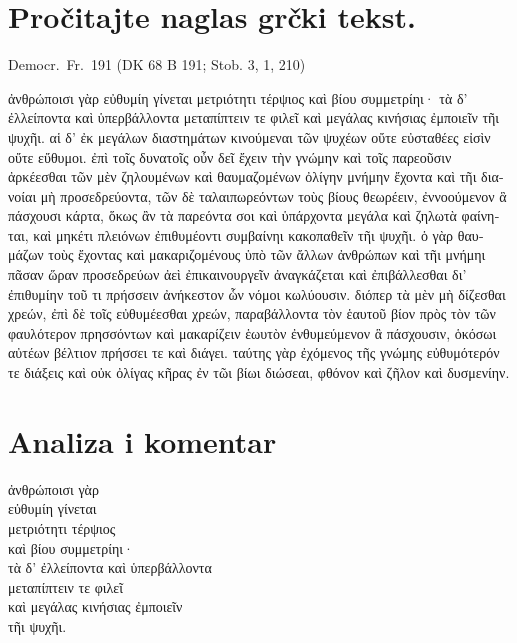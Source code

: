 
\section*{Pročitajte naglas grčki tekst.}

Democr.\ Fr.\ 191 (DK 68 B 191; Stob. 3, 1, 210)


\medskip


{\large

\begin{greek}

\noindent ἀνθρώποισι γὰρ εὐθυμίη γίνεται μετριότητι τέρψιος καὶ βίου συμμετρίηι· τὰ δ' ἐλλείποντα καὶ ὑπερβάλλοντα μεταπίπτειν τε φιλεῖ καὶ μεγάλας κινήσιας ἐμποιεῖν τῆι ψυχῆι. αἱ δ' ἐκ μεγάλων διαστημάτων κινούμεναι τῶν ψυχέων οὔτε εὐσταθέες εἰσὶν οὔτε εὔθυμοι. ἐπὶ τοῖς δυνατοῖς οὖν δεῖ ἔχειν τὴν γνώμην καὶ τοῖς παρεοῦσιν ἀρκέεσθαι τῶν μὲν ζηλουμένων καὶ θαυμαζομένων ὀλίγην μνήμην ἔχοντα καὶ τῆι διανοίαι μὴ προσεδρεύοντα, τῶν δὲ ταλαιπωρεόντων τοὺς βίους θεωρέειν, ἐννοούμενον ἃ πάσχουσι κάρτα, ὅκως ἂν τὰ παρεόντα σοι καὶ ὑπάρχοντα μεγάλα καὶ ζηλωτὰ φαίνηται, καὶ μηκέτι πλειόνων ἐπιθυμέοντι συμβαίνηι κακοπαθεῖν τῆι ψυχῆι. ὁ γὰρ θαυμάζων τοὺς ἔχοντας καὶ μακαριζομένους ὑπὸ τῶν ἄλλων ἀνθρώπων καὶ τῆι μνήμηι πᾶσαν ὥραν προσεδρεύων ἀεὶ ἐπικαινουργεῖν ἀναγκάζεται καὶ ἐπιβάλλεσθαι δι' ἐπιθυμίην τοῦ τι πρήσσειν ἀνήκεστον ὧν νόμοι κωλύουσιν. διόπερ τὰ μὲν μὴ δίζεσθαι χρεών, ἐπὶ δὲ τοῖς εὐθυμέεσθαι χρεών, παραβάλλοντα τὸν ἑαυτοῦ βίον πρὸς τὸν τῶν φαυλότερον πρησσόντων καὶ μακαρίζειν ἑωυτὸν ἐνθυμεύμενον ἃ πάσχουσιν, ὁκόσωι αὐτέων βέλτιον πρήσσει τε καὶ διάγει. ταύτης γὰρ ἐχόμενος τῆς γνώμης εὐθυμότερόν τε διάξεις καὶ οὐκ ὀλίγας κῆρας ἐν τῶι βίωι διώσεαι, φθόνον καὶ ζῆλον καὶ δυσμενίην. 

\end{greek}

}


\section*{Analiza i komentar}


{\large
\begin{greek}
\noindent ἀνθρώποισι γὰρ \\
εὐθυμίη γίνεται \\
\tabto{2em} μετριότητι τέρψιος \\
\tabto{2em} καὶ βίου συμμετρίηι·\\
τὰ δ' ἐλλείποντα καὶ ὑπερβάλλοντα \\
μεταπίπτειν τε φιλεῖ \\
καὶ μεγάλας κινήσιας ἐμποιεῖν \\
\tabto{2em} τῆι ψυχῆι. \\

\end{greek}
}

